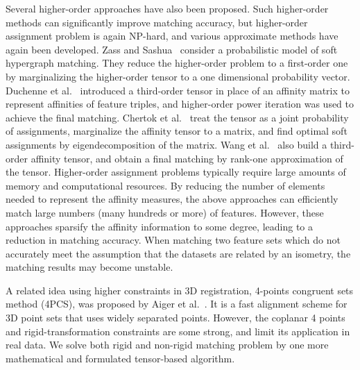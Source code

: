 Several higher-order approaches have also been proposed.
Such higher-order methods can significantly improve matching accuracy,
but higher-order assignment problem is again NP-hard, and various approximate methods have again been developed.
Zass and Sashua~\cite{Zass08} consider a probabilistic model of soft hypergraph matching.
They reduce the higher-order problem to a first-order one by marginalizing the higher-order tensor to a one dimensional probability vector.
Duchenne et al.~\cite{Duchenne_etal09} introduced a third-order tensor in place of an affinity matrix to represent affinities of feature triples,
and higher-order power iteration was used to achieve the final matching.
Chertok et al.~\cite{Chertok10} treat the tensor as a joint probability of assignments, marginalize the affinity tensor to a matrix,
and find optimal soft assignments by eigendecomposition of the matrix.
Wang et al.~\cite{Aiping10} also build a third-order affinity tensor, and obtain a final matching by rank-one approximation of the tensor.
Higher-order assignment problems typically require large amounts of memory and computational resources.
By reducing the number of elements needed to represent the affinity measures,
the above approaches can efficiently match large numbers (many hundreds or more) of features.
However, these approaches sparsify the affinity information to some degree, leading to a reduction in matching accuracy.
When matching two feature sets which do not accurately meet the assumption that the datasets are related by an isometry, the matching results may become unstable.

A related idea using higher constraints in 3D registration, 4-points congruent sets method (4PCS), was proposed by Aiger et al.~\cite{Aiger08}.
It is a fast alignment scheme for 3D point sets that uses widely separated points.
However, the coplanar 4 points and rigid-transformation constraints are some strong, and limit its application in real data.
We solve both rigid and non-rigid matching problem by one more mathematical and formulated tensor-based algorithm.
